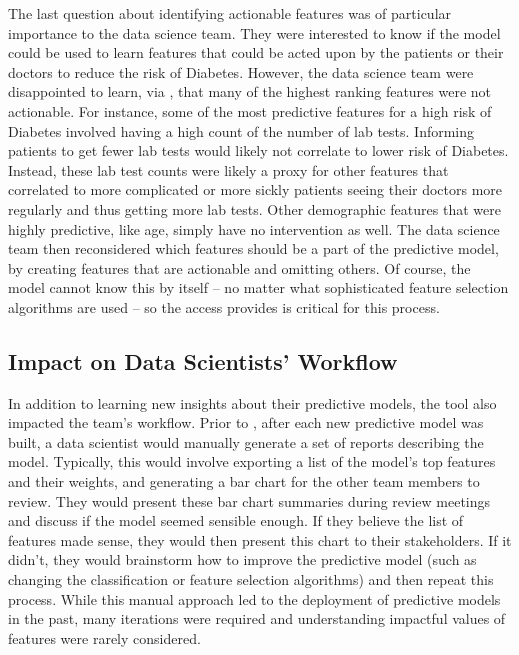 The last question about identifying actionable features was of particular importance to the data science team.  They were interested to know if the model could be used to learn features that could be acted upon by the patients or their doctors to reduce the risk of Diabetes.  However, the data science team were disappointed to learn, via \prospector, that many of the highest ranking features were not actionable.  For instance, some of the most predictive features for a high risk of Diabetes involved having a high count of the number of lab tests.  Informing patients to get fewer lab tests would likely not correlate to lower risk of Diabetes.  Instead, these lab test counts were likely a proxy for other features that correlated to more complicated or more sickly patients seeing their doctors more regularly and thus getting more lab tests.  Other demographic features that were highly predictive, like age, simply have no intervention as well.  The data science team then reconsidered which features should be a part of the predictive model, by creating features that are actionable and omitting others.  Of course, the model cannot know this by itself -- no matter what sophisticated feature selection algorithms are used -- so the access \prospector provides is critical for this process.

\subsection{Impact on Data Scientists' Workflow}

In addition to learning new insights about their predictive models, the tool also impacted the team's workflow.  Prior to \prospector, after each new predictive model was built, a data scientist would manually generate a set of reports describing the model.  Typically, this would involve exporting a list of the model's top features and their weights, and generating a bar chart for the other team members to review.  They would present these bar chart summaries during review meetings and discuss if the model seemed sensible enough.  If they believe the list of features made sense, they would then present this chart to their stakeholders.  If it didn't, they would brainstorm how to improve the predictive model (such as changing the classification or feature selection algorithms) and then repeat this process.  While this manual approach led to the deployment of predictive models in the past, many iterations were required and understanding impactful values of features were rarely considered.

